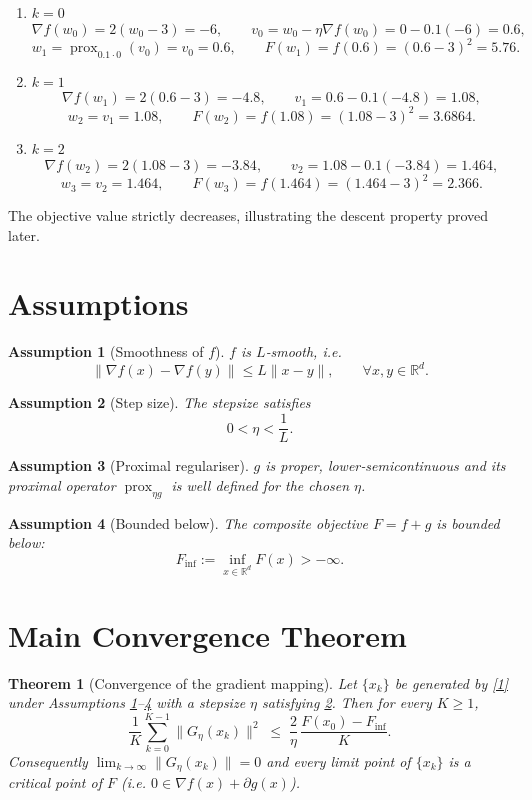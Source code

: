 \documentclass{article}
\newtheorem{theorem}{Theorem}
\newtheorem{assumption}{Assumption}
\newcommand{\prox}{\operatorname{prox}}
\newcommand{\grad}{\nabla}
\newcommand{\R}{\mathbb{R}}
\begin{document}
\begin{enumerate}[label=Iteration \arabic*:, leftmargin=*]
\item $k=0$  
\[
\grad f(w_{0})=2(w_{0}-3)=-6,\qquad
v_{0}=w_{0}-\eta\grad f(w_{0})=0-0.1(-6)=0.6,
\]
\[
w_{1}= \prox_{0.1\cdot 0}(v_{0})=v_{0}=0.6,\qquad
F(w_{1})=f(0.6)=(0.6-3)^{2}=5.76.
\]

\item $k=1$  
\[
\grad f(w_{1})=2(0.6-3)=-4.8,\qquad
v_{1}=0.6-0.1(-4.8)=1.08,
\]
\[
w_{2}=v_{1}=1.08,\qquad
F(w_{2})=f(1.08)=(1.08-3)^{2}=3.6864.
\]

\item $k=2$  
\[
\grad f(w_{2})=2(1.08-3)=-3.84,\qquad
v_{2}=1.08-0.1(-3.84)=1.464,
\]
\[
w_{3}=v_{2}=1.464,\qquad
F(w_{3})=f(1.464)=(1.464-3)^{2}=2.366.
\]
\end{enumerate}
The objective value strictly decreases, illustrating the descent property proved later.

\newpage
\section*{Assumptions}
\begin{assumption}[Smoothness of $f$]\label{asm:smooth}
$f$ is $L$‑smooth, i.e.
\[
\|\grad f(x)-\grad f(y)\|\le L\|x-y\|,\qquad\forall x,y\in\R^{d}.
\tag{A1}
\]
\end{assumption}
\begin{assumption}[Step size]\label{asm:step}
The stepsize satisfies
\[
0<\eta<\frac{1}{L}.
\tag{A2}
\]
\end{assumption}
\begin{assumption}[Proximal regulariser]\label{asm:prox}
$g$ is proper, lower‑semicontinuous and its proximal operator $\prox_{\eta g}$ is \emph{well defined} for the chosen $\eta$.
\end{assumption}
\begin{assumption}[Bounded below]\label{asm:bounded}
The composite objective $F=f+g$ is bounded below:
\[
F_{\inf}:=\inf_{x\in\R^{d}}F(x)>-\infty .
\tag{A4}
\]
\end{assumption}

\section*{Main Convergence Theorem}
\begin{theorem}[Convergence of the gradient mapping]\label{thm:main}
Let $\{x_{k}\}$ be generated by \eqref{1} under Assumptions \ref{asm:smooth}–\ref{asm:bounded} with a stepsize $\eta$ satisfying \ref{asm:step}. Then for every $K\ge1$,
\begin{equation}
\frac{1}{K}\sum_{k=0}^{K-1}\|G_{\eta}(x_{k})\|^{2}
\;\le\;
\frac{2}{\eta}\,\frac{F(x_{0})-F_{\inf}}{K}.
\tag{2}
\end{equation}
Consequently $\displaystyle\lim_{k\to\infty}\|G_{\eta}(x_{k})\|=0$ and every limit point of $\{x_{k}\}$ is a critical point of $F$ (i.e. $0\in\grad f(x)+\partial g(x)$).
\end{theorem}
\end{document}
